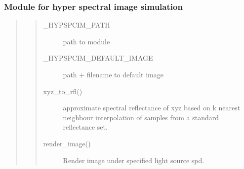 \documentclass[letterpaper,10pt,english]{sphinxmanual}
\begin{document}
\subsubsection{Module for hyper spectral image simulation}
\label{\detokenize{toolboxes:module-for-hyper-spectral-image-simulation}}\begin{quote}
\begin{quote}\begin{description}
\item[{\_HYPSPCIM\_PATH}] \leavevmode
path to module

\item[{\_HYPSPCIM\_DEFAULT\_IMAGE}] \leavevmode
path + filename to default image

\item[{xyz\_to\_rfl()}] \leavevmode
approximate spectral reflectance of xyz based on k nearest 
neighbour interpolation of samples from a standard reflectance 
set.

\item[{render\_image()}] \leavevmode
Render image under specified light source spd.

\end{description}\end{quote}
\end{quote}
\end{document}
